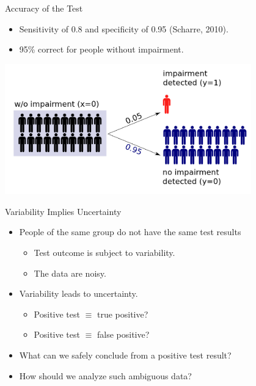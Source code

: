 \documentclass{beamer}
\begin{document}
\begin{frame}{Accuracy of the Test}
\begin{itemize}
  \item Sensitivity of 0.8 and specificity of 0.95 (Scharre, 2010).
  \item 95\% correct for people without impairment.
\end{itemize}
\begin{center}
  \includegraphics[width=0.8\textwidth]{without_impairment.png}
\end{center}
\end{frame}

\begin{frame}{Variability Implies Uncertainty}
\begin{itemize}
\item People of the same group do not have the same test results
  \begin{itemize}
  \item Test outcome is subject to variability.
  \item The data are noisy.
  \end{itemize}
\item Variability leads to uncertainty.
  \begin{itemize}
  \item Positive test $\equiv$ true positive?
  \item Positive test $\equiv$ false positive?
  \end{itemize}
\item What can we safely conclude from a positive test result?
\item How should we analyze such ambiguous data?
\end{itemize}
\end{frame}
\end{document}
